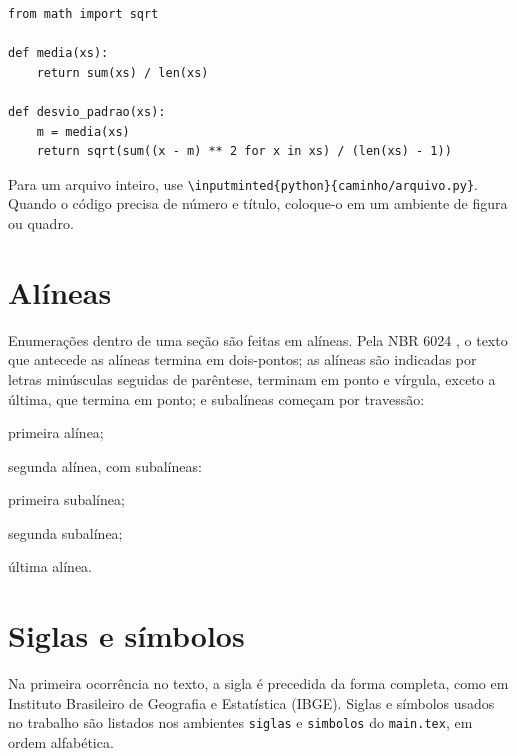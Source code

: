 \begin{verbatim}
from math import sqrt

def media(xs):
    return sum(xs) / len(xs)

def desvio_padrao(xs):
    m = media(xs)
    return sqrt(sum((x - m) ** 2 for x in xs) / (len(xs) - 1))
\end{verbatim}

Para um arquivo inteiro, use \verb|\inputminted{python}{caminho/arquivo.py}|. Quando o código precisa de número e título, coloque-o em um ambiente de figura ou quadro.

\section{Alíneas}\label{sec:alineas}

Enumerações dentro de uma seção são feitas em alíneas. Pela NBR 6024 \cite{abnt6024}, o texto que antecede as alíneas termina em dois-pontos; as alíneas são indicadas por letras minúsculas seguidas de parêntese, terminam em ponto e vírgula, exceto a última, que termina em ponto; e subalíneas começam por travessão:

\begin{alineas}
	\item primeira alínea;
	\item segunda alínea, com subalíneas:
	\begin{subalineas}
		\item primeira subalínea;
		\item segunda subalínea;
	\end{subalineas}
	\item última alínea.
\end{alineas}

\section{Siglas e símbolos}\label{sec:siglas}

Na primeira ocorrência no texto, a sigla é precedida da forma completa, como em Instituto Brasileiro de Geografia e Estatística (IBGE). Siglas e símbolos usados no trabalho são listados nos ambientes \texttt{siglas} e \texttt{simbolos} do \texttt{main.tex}, em ordem alfabética.
